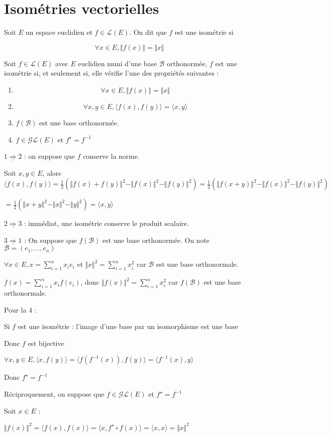 \documentclass[a4paper,12pt]{book}
\newcommand{\Def}[2]{\begin{tcolorbox}[sharp corners, colback=white,colframe=blue!90!black!75, title=Définition : #1]#2\end{tcolorbox}}
\newcommand{\Prop}[2]{\begin{tcolorbox}[sharp corners, colback=white,colframe=red!90!black!75, title=Proposition : #1]#2\end{tcolorbox}}
\newcommand{\Pre}[1]{\begin{tcolorbox}[sharp corners, colback=white,colframe=green!60!green!30!black!75, title=Preuve]#1\end{tcolorbox}}
\begin{document}
\section{Isométries vectorielles}
\Def{}{Soit $E$ un espace euclidien et $f\in\mathcal{L}(E)$. On dit que $f$ est une isométrie si
\par $$\forall x\in E, \Vert f(x)\Vert = \Vert x\Vert$$}
\Prop{Caractérisation}{Soit $f\in\mathcal{L}(E)$ avec $E$ euclidien muni d'une base $\mathcal{B}$ orthonormée, $f$ est une isométrie si, et seulement si, elle vérifie l'une des propriétés suivantes :\begin{enumerate}
\item $$\forall x\in E, \Vert f(x)\Vert=\Vert x\Vert$$
\item $$\forall x,y\in E, \langle f(x), f(y)\rangle = \langle x, y\rangle$$
\item $f(\mathcal{B})$ est une base orthonormée.
\item $f\in\mathcal{GL}(E)$ et $f^\star=f^{-1}$
\end{enumerate}}
\Pre{$\underline{1\Rightarrow 2}$ : on suppose que $f$ conserve la norme.
\par Soit $x,y\in E$, alors $\langle f(x), f(y)\rangle = \frac{1}{2}\left(\Vert f(x)+f(y)\Vert^2 - \Vert f(x)\Vert^2 - \Vert f(y)\Vert^2\right) = \frac{1}{2}\left(\Vert f(x+y)\Vert^2 - \Vert f(x)\Vert^2 - \Vert f(y)\Vert^2\right)$
\par $ = \frac{1}{2}\left(\Vert x+y\Vert^2 - \Vert x\Vert^2-\Vert y\Vert^2\right) = \langle x, y\rangle$
\par $\underline{2\Rightarrow 3}$ : immédiat, une isométrie conserve le produit scalaire.
\par $\underline{3\Rightarrow 1}$ : On suppose que $f(\mathcal{B})$ est une base orthonormée. On note $\mathcal{B}=(e_1,..., e_n)$
\par $\forall x\in E,x =\sum\limits_{i=1}^n x_ie_i$ et $\Vert x\Vert^2=\sum\limits_{i=1}^n x_i^2$ car $\mathcal{B}$ est une base orthonormale.
\par $f(x) = \sum\limits_{i=1}^nx_if(e_i)$, donc $\Vert f(x)\Vert^2 = \sum\limits_{i=1}^nx_i^2$ car $f(\mathcal{B})$ est une base orthonormale.
\par Pour la 4 : 
\par Si $f$ est une isométrie : l'image d'une base par un isomorphisme est une base
\par Donc $f$ est bijective
\par $\forall x,y\in E, \langle x, f(y)\rangle = \langle f(f^{-1}(x)), f(y)\rangle = \langle f^{-1}(x), y\rangle$
\par Donc $f^\star = f^{-1}$
\par Réciproquement, on suppose que $f\in\mathcal{GL}(E)$ et $f^\star=f^{-1}$
\par Soit $x\in E$ :
\par $\Vert f(x)\Vert^2 = \langle f(x), f(x)\rangle = \langle x, f^\star\circ f(x)\rangle = \langle x, x\rangle = \Vert x\Vert^2$}
\end{document}

